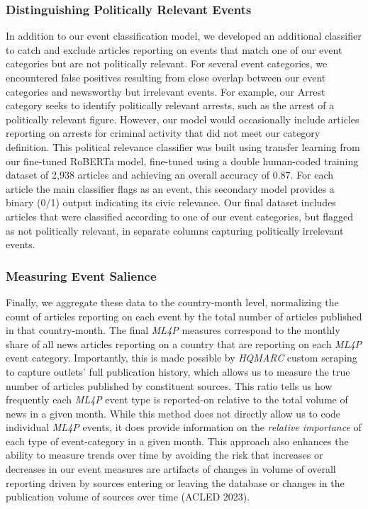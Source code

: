 \documentclass[
  letterpaper,
  DIV=11,
  numbers=noendperiod]{scrartcl}
\begin{document}
\hypertarget{distinguishing-politically-relevant-events}{%
\subsubsection{Distinguishing Politically Relevant
Events}\label{distinguishing-politically-relevant-events}}

In addition to our event classification model, we developed an
additional classifier to catch and exclude articles reporting on events
that match one of our event categories but are not politically relevant.
For several event categories, we encountered false positives resulting
from close overlap between our event categories and newsworthy but
irrelevant events. For example, our Arrest category seeks to identify
politically relevant arrests, such as the arrest of a politically
relevant figure. However, our model would occasionally include articles
reporting on arrests for criminal activity that did not meet our
category definition. This political relevance classifier was built using
transfer learning from our fine-tuned RoBERTa model, fine-tuned using a
double human-coded training dataset of 2,938 articles and achieving an
overall accuracy of 0.87. For each article the main classifier flags as
an event, this secondary model provides a binary (0/1) output indicating
its civic relevance. Our final dataset includes articles that were
classified according to one of our event categories, but flagged as not
politically relevant, in separate columns capturing politically
irrelevant events.

\hypertarget{measuring-event-salience}{%
\subsubsection{Measuring Event
Salience}\label{measuring-event-salience}}

Finally, we aggregate these data to the country-month level, normalizing
the count of articles reporting on each event by the total number of
articles published in that country-month. The final \emph{ML4P} measures
correspond to the monthly share of all news articles reporting on a
country that are reporting on each \emph{ML4P} event category.
Importantly, this is made possible by \emph{HQMARC} custom scraping to
capture outlets' full publication history, which allows us to measure
the true number of articles published by constituent sources. This ratio
tells us how frequently each \emph{ML4P} event type is reported-on
relative to the total volume of news in a given month. While this method
does not directly allow us to code individual \emph{ML4P} events, it
does provide information on the \emph{relative importance} of each type
of event-category in a given month. This approach also enhances the
ability to measure trends over time by avoiding the risk that increases
or decreases in our event measures are artifacts of changes in volume of
overall reporting driven by sources entering or leaving the database or
changes in the publication volume of sources over time (ACLED 2023).
\end{document}
